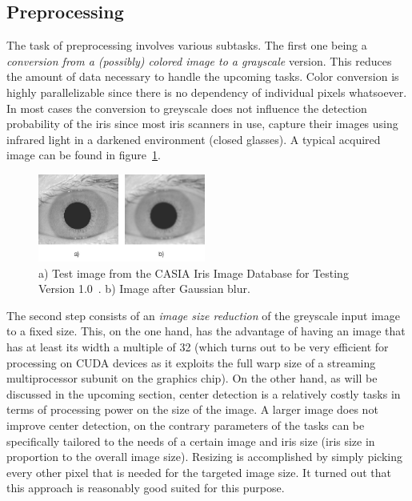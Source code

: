 \documentclass[journal]{IEEEtran}
\begin{document}
\subsection{Preprocessing}

The task of preprocessing involves various subtasks. The first one being a \emph{conversion from a (possibly) colored image to a grayscale} version. This reduces the amount of data necessary to handle the upcoming tasks. Color conversion is highly parallelizable since there is no dependency of individual pixels whatsoever. In most cases the conversion to greyscale does not influence the detection probability of the iris since most iris scanners in use, capture their images using infrared light in a darkened environment (closed glasses). A typical acquired image can be found in figure~\ref{fig:input}.
\begin{figure}[ht]
	\centering
  \includegraphics[width=0.49\textwidth]{iris/resized.jpg}
	\caption{a) Test image from the CASIA Iris Image Database for Testing Version 1.0~\cite{ir-testv1}. b) Image after Gaussian blur.}
	\label{fig:input}
\end{figure}
\par The second step consists of an \emph{image size reduction} of the greyscale input image to a fixed size. This, on the one hand, has the advantage of having an image that has at least its width a multiple of 32 (which turns out to be very efficient for processing on CUDA devices as it exploits the full warp size of a streaming multiprocessor subunit on the graphics chip). On the other hand, as will be discussed in the upcoming section, center detection is a relatively costly tasks in terms of processing power on the size of the image. A larger image does not improve center detection, on the contrary parameters of the tasks can be specifically tailored to the needs of a certain image and iris size (iris size in proportion to the overall image size). Resizing is accomplished by simply picking every other pixel that is needed for the targeted image size. It turned out that this approach is reasonably good suited for this purpose.
\end{document}
